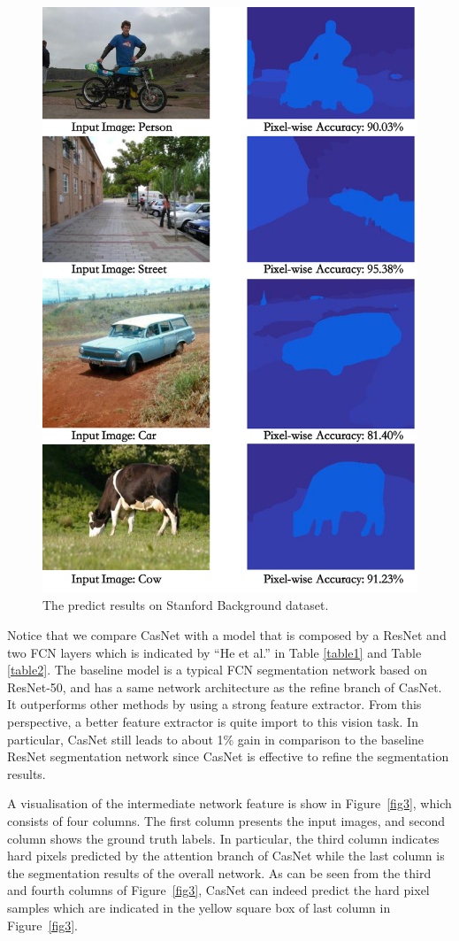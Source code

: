 \documentclass[10.5pt,compsoc]{TsT}
\newcommand{\upcite}[1]{\superscript{\textsuperscript{\cite{#1}}}}
\theoremstyle{mystyle}
\newcommand{\upcite}[1]{\textsuperscript{\cite{#1}}}
\begin{document}
\begin{figure}[ht]
\centering
\includegraphics[width=0.85\columnwidth]{fig4.png}
\caption{The predict results on Stanford Background dataset.}
\label{fig4}
\end{figure} 

Notice that we compare CasNet with a model that is composed by a ResNet and two FCN layers which is indicated by ``He et al.\upcite{1}'' in Table \ref{table1} and Table \ref{table2}. The baseline model is a  typical FCN segmentation network based on ResNet-50, and has a same network architecture as the refine branch of CasNet. It outperforms other methods by using a strong feature extractor. From this perspective, a better feature extractor is quite import to this vision task. In particular, CasNet still leads to about 1\% gain in comparison to the baseline ResNet segmentation network since CasNet is effective to refine the segmentation results.

A visualisation of the intermediate network feature is show in Figure~\ref{fig3}, which consists of four columns. The first column presents the input images, and second column shows the ground truth labels. In particular, the third column indicates hard pixels predicted by the attention branch of CasNet while the last column is the segmentation results of the overall network. As can be seen from the third and fourth columns of Figure~\ref{fig3}, CasNet can indeed predict the hard pixel samples which are indicated in the yellow square box of last column in Figure~\ref{fig3}.
\end{document}
